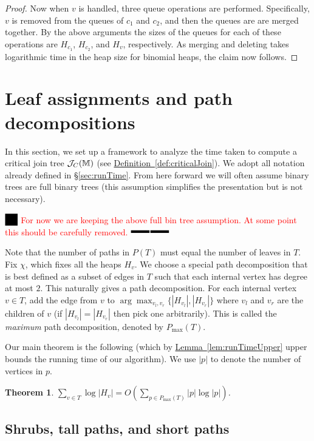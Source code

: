 \documentclass[11pt]{article}
\newtheorem{theorem}{Theorem}
\theoremstyle{definition}
\newcommand{\cJ}{{\cal J}}
\newcommand{\MM}{\mathbb{M}}
\newcommand{\Sec}[1]{\hyperref[sec:#1]{\S\ref*{sec:#1}}} %
\newcommand{\Lem}[1]{\hyperref[lem:#1]{Lemma~\ref*{lem:#1}}} %
\newcommand{\Def}[1]{\hyperref[def:#1]{Definition~\ref*{def:#1}}} %
\newcommand{\jc}{\cJ_C}
\newcommand{\pmax}{P_{\max}}
\newcommand{\XSays}[2]{{
      {$\rule[-0.12cm]{0.2in}{0.5cm}$\fbox{\tt
            #1:} }
      \textcolor{red}{#2}
      \marginpar{\textcolor{blue}{#1}}
      {$\rule[0.1cm]{0.3in}{0.1cm}$\fbox{\tt
            end}$\rule[0.1cm]{0.3in}{0.1cm}$}
      }
   }
\newcommand{\Ben}[1]{{\XSays{Ben}{#1}}}
\begin{document}
\begin{proof}
Now when $v$ is handled, three queue operations are performed.  Specifically, $v$ is removed from the queues of $c_1$ and $c_2$, and then the queues are 
are merged together.  By the above arguments the sizes of the queues for each of these operations are $H_{c_1}$, $H_{c_2}$, and $H_v$, respectively.  
As merging and deleting takes logarithmic time in the heap size for binomial heaps, the claim now follows.
\end{proof}




\newcommand{\pathTree}{P_{\mathcal{S}}}
\newcommand{\pathTreeA}{\mathcal{P}_{\mathcal{S}}}
\section{Leaf assignments and path decompositions}

In this section, we set up a framework to analyze the time taken to compute a critical join tree $\jc(\MM)$ (see \Def{criticalJoin}).
We adopt all notation already defined in \Sec{runTime}.  From here forward we will often assume binary trees are full binary trees 
(this assumption simplifies the presentation but is not necessary).

\Ben{For now we are keeping the above full bin tree assumption. At some point this should be carefully removed.}

Note that the number of paths in $P(T)$ must equal the number of leaves in $T$.
Fix $\chi$, which fixes all the heaps $H_v$. We choose a special path decomposition that is best defined as a subset of edges in $T$ such that each internal
vertex has degree at most $2$. This naturally gives a path decomposition.
For each internal vertex $v\in T$, add the edge from $v$ to $\arg \max_{v_l, v_r} \{|H_{v_l}|, |H_{v_r}|\}$ 
 where $v_l$ and $v_r$ are the children of $v$ (if $|H_{v_l}|=|H_{v_r}|$ then pick one arbitrarily).
This is called the \emph{maximum} path decomposition, denoted by $\pmax(T)$.

Our main theorem is the following (which by \Lem{runTimeUpper} upper bounds the running time of our algorithm). We use $|p|$ to denote the number of vertices in $p$.

\begin{theorem} \label{thm:runtime} $\sum_{v \in T} \log |H_v| = O(\sum_{p\in \pmax(T)} |p| \log |p|)$.
\end{theorem}


\subsection{Shrubs, tall paths, and short paths}
\end{document}
